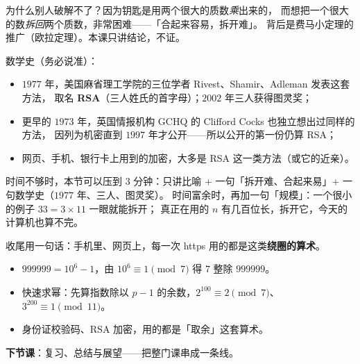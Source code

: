 \begin{zhu}
  为什么别人破解不了？因为钥匙是用两个很大的质数\emph{乘}出来的，
  而想把一个很大的数\emph{拆回}两个质数，非常困难——「合起来容易，拆开难」。
  背后是费马小定理的推广（欧拉定理）。本课只讲结论，不证。
\end{zhu}

\begin{zhu}
  数学史（务必说准）：
  \begin{itemize}
    \item \(1977\) 年，美国麻省理工学院的三位学者 Rivest、Shamir、Adleman 发表这套方法，
          取名 \textbf{RSA}（三人姓氏的首字母）；\(2002\) 年三人获得图灵奖；
    \item 更早的 \(1973\) 年，英国情报机构 GCHQ 的 Clifford Cocks 也独立想出过同样的方法，
          因列为机密直到 \(1997\) 年才公开——所以公开的第一份仍算 RSA；
    \item 网页、手机、银行卡上用到的加密，大多是 RSA 这一类方法（或它的近亲）。
  \end{itemize}
\end{zhu}

\begin{zhu}
  时间不够时，本节可以压到 3 分钟：只讲比喻 + 一句「拆开难、合起来易」+ 一句数学史（\(1977\) 年、三人、图灵奖）。
  时间富余时，再加一句「规模」：一个很小的例子 \(33=3\times11\) 一眼就能拆开；
  真正在用的 \(n\) 有几百位长，拆开它，今天的计算机也算不完。
\end{zhu}

收尾用一句话：手机里、网页上，每一次 https 用的都是这类\textbf{绕圈的算术}。

\begin{xiaojie}
  \begin{itemize}
    \item \(999999=10^{6}-1\)，由 \(10^{6}\equiv1\pmod7\) 得 \(7\) 整除 \(999999\)。
    \item 快速求幂：先算指数除以 \(p-1\) 的余数，\(2^{100}\equiv2\pmod7\)、\(3^{200}\equiv1\pmod{11}\)。
    \item 身份证校验码、RSA 加密，用的都是「取余」这套算术。
  \end{itemize}
\end{xiaojie}

\noindent\textbf{下节课}：复习、总结与展望——把整门课串成一条线。